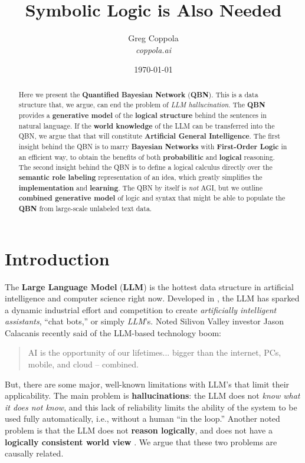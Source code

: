 \documentclass[12pt]{article}
\title{\bf Symbolic Logic is Also Needed}
\author{
    Greg Coppola \\
    {\em coppola.ai}
}
\date{\today}
\begin{document}
\maketitle


\begin{abstract}
Here we present the {\bf Quantified Bayesian Network} ({\bf QBN}).
This is a data structure that, we argue, can end the problem of {\em LLM hallucination}.
The {\bf QBN} provides a {\bf generative model} of the {\bf logical structure} behind the sentences in natural language.
If the {\bf world knowledge} of the LLM can be transferred into the QBN, we argue that that will constitute {\bf Artificial General Intelligence}.
The first insight behind the QBN is to marry {\bf Bayesian Networks} with {\bf First-Order Logic} in an efficient way, to obtain the benefits of both {\bf probabilitic} and {\bf logical} reasoning.
The second insight behind the QBN is to define a logical calculus directly over the {\bf semantic role labeling} representation of an idea, which greatly simplifies the {\bf implementation} and {\bf learning}.
The QBN by itself is {\em not} AGI, but we outline {\bf combined generative model} of logic and syntax that might be able to populate the {\bf QBN} from large-scale unlabeled text data.
\end{abstract}


\tableofcontents

\section{Introduction}
The {\bf Large Language Model} ({\bf LLM}) is the hottest data structure in artificial intelligence and computer science right now.
Developed in \cite{vaswani2017attention, devlin2018bert, radford2018improving, brown2020language}, the LLM has sparked a dynamic industrial effort and competition to create {\em artificially intelligent assistants}, ``chat bots,'' or simply {\em LLM}'s.
Noted Silivon Valley investor Jason Calacanis recently said of the LLM-based technology boom:
\begin{quote}
    AI is the opportunity of our lifetimes... 
    bigger than the internet, PCs, mobile, and cloud -- combined.  
    \cite{Jason2023}
\end{quote}
But, there are some major, well-known limitations with LLM's that limit their applicability.
The main problem is {\bf hallucinations}: the LLM does not {\em know what it does not know}, and this lack of reliability limits the ability of the system to be used fully automatically, i.e., without a human ``in the loop.''
Another noted problem is that the LLM does not {\bf reason logically}, and does not have a {\bf logically consistent world view} \cite{hinton:cbs:2023, steedman:2022}.
We argue that these two problems are causally related.
\end{document}
